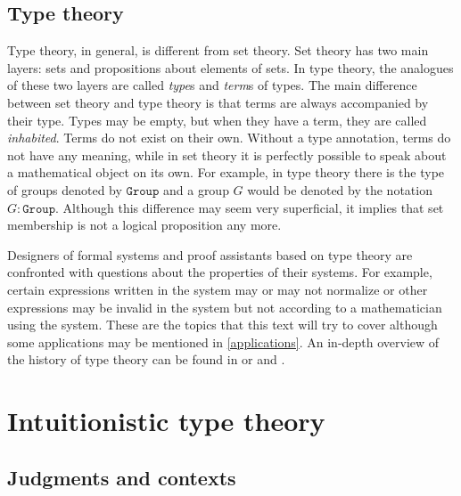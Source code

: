 \documentclass[11pt,a4paper,twoside,xetex,draft]{book}
\newcommand{\keyword}[1]{\emph{#1}\index{#1}}
\newcommand{\op}[1]{\mathtt{#1}}
\begin{document}




\subsection{Type theory}

Type theory, in general, is different from set theory. Set theory has two main layers: sets and propositions about elements of sets. In type theory, the analogues of these two layers are called \keyword{type}s and \keyword{term}s of types. The main difference between set theory and type theory is that terms are always accompanied by their type. Types may be empty, but when they have a term, they are called \keyword{inhabited}. Terms do not exist on their own. Without a type annotation, terms do not have any meaning, while in set theory it is perfectly possible to speak about a mathematical object on its own. For example, in type theory there is the type of groups denoted by $\op{Group}$ and a group $G$ would be denoted by the notation $G : \op{Group}$. Although this difference may seem very superficial, it implies that set membership is not a logical proposition any more. 

Designers of formal systems and proof assistants based on type theory are confronted with questions about the properties of their systems. For example, certain expressions written in the system may or may not normalize or other expressions may be invalid in the system but not according to a mathematician using the system. These are the topics that this text will try to cover although some applications may be mentioned in \cref{applications}. An in-depth overview of the history of type theory can be found in \cite{Coquand2013oct} or \cite{Constable2011} and \cite{Constable2015July}.


\section{Intuitionistic type theory}

\subsection{Judgments and contexts}
\end{document}
